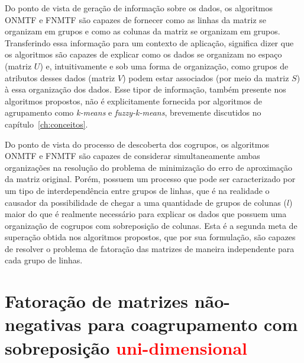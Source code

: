 \documentclass[
    12pt,                %
    oneside,            %
    a4paper,            %
    english,            %
    brazil                %
    ]{abntex2ppgsi}
\begin{document}
Do ponto de vista de geração de informação sobre os dados, os algoritmos ONMTF e FNMTF são capazes de fornecer como as linhas da matriz se organizam em grupos e como as colunas da matriz se organizam em grupos. Transferindo essa informação para um contexto de aplicação, significa dizer que os algoritmos são capazes de explicar como os dados se organizam no espaço (matriz $U$) e, intuitivamente e sob uma forma de organização, como grupos de atributos desses dados (matriz $V$) podem estar associados (por meio da matriz $S$) à essa organização dos dados. Esse tipor de informação, também presente nos algoritmos propostos, não é explicitamente fornecida por algoritmos de agrupamento como \textit{k-means} e \textit{fuzzy-k-means}, brevemente discutidos no capítulo~\ref{ch:conceitos}.

Do ponto de vista do processo de descoberta dos cogrupos, os algoritmos ONMTF e FNMTF são capazes de considerar simultaneamente ambas organizações na resolução do problema de minimização do erro de aproximação da matriz original. Porém, possuem um processo que pode ser caracterizado por um tipo de interdependência entre grupos de linhas, que é na realidade o causador da possibilidade de chegar a uma quantidade de grupos de colunas ($l$) maior do que é realmente necessário para explicar os dados que possuem uma organização de cogrupos com sobreposição de colunas. Esta é a segunda meta de superação obtida nos algoritmos propostos, que por sua formulação, são capazes de resolver o problema de fatoração das matrizes de maneira independente para cada grupo de linhas.



\chapter{Fatoração de matrizes não-negativas para coagrupamento com sobreposição \textcolor{red}{uni-dimensional}}
\label{ch:proposedalgs}
\end{document}
